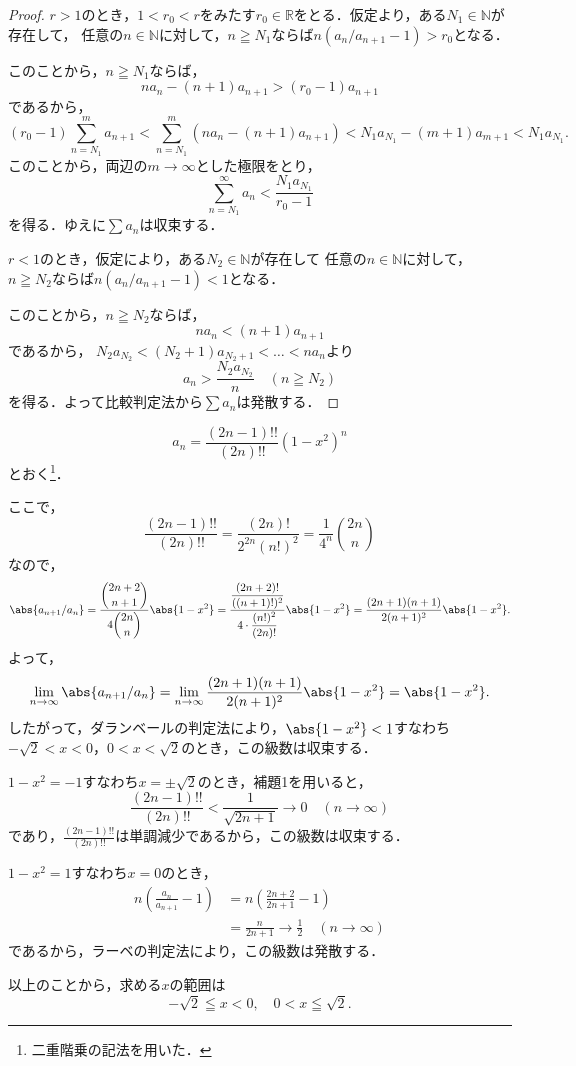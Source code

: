 \begin{proof}
    $r>1$のとき，$ 1< r_0 < r$をみたす$r_0 \in \mathbb{R}$をとる．仮定より，ある$N_1 \in \mathbb{N}$が存在して，
    任意の$n \in \mathbb{N}$に対して，$n \geqq N_1$ならば$n (a_n/a_{n+1}-1) > r_0$となる．

    このことから，$ n \geqq N_1$ならば，
    \[
        n a_n -(n+1)a_{n+1} > (r_0-1) a_{n+1}
    \]
    であるから，
    \[
        (r_0-1) \sum_{n=N_1}^{m} a_{n+1}  < \sum_{n=N_1}^{m} (n a_n - (n+1) a_{n+1})
        <N_1 a_{N_1} - (m+1) a_{m+1}
        < N_1 a_{N_1}.
    \]
    このことから，両辺の$m \to \infty$とした極限をとり，
    \[
        \sum_{n=N_1}^{\infty} a_n <\frac{N_1 a_{N_1}}{r_0-1}
    \]
    を得る．ゆえに$\sum a_n$は収束する．

    $r < 1$のとき，仮定により，ある$N_2 \in \mathbb{N}$が存在して
    任意の$n \in \mathbb{N}$に対して，$n \geqq N_2$ならば$n(a_n/a_{n+1}-1) < 1$となる．

    このことから，$n \geqq N_2$ならば，
    \[
        n a_n < (n+1) a_{n+1}
    \]
    であるから， $N_2 a_{N_2} < (N_2 +1)a_{N_2+1} <  \dots< n a_n $より
    \[
        a_n > \frac{N_2 a_{N_2}}{n} \quad (n \geqq N_2)
    \]
    を得る．よって比較判定法から$\sum a_n$は発散する．
\end{proof}

\begin{tanswer}
    \[
        a_n = \frac{(2n-1)!!}{(2n)!!} (1-x^2)^n
    \]
    とおく\footnote{二重階乗の記法を用いた．}．

    ここで，
    \[
        \frac{(2n-1)!!}{(2n)!!} = \frac{(2n)!}{2^{2n}(n!)^2} = \frac{1}{4^n} \binom{2n}{n}
    \]
    なので，
    \[
        \abs{a_{n+1}/a_n}  = \frac{\dbinom{2n+2}{n+1}}{4\dbinom{2n}{n}} \abs{1-x^2}
        =  \frac{\dfrac{(2n+2)!}{((n+1)!)^2}}{4\cdot \dfrac{(n!)^2}{(2n)!}} \abs{1-x^2}
        =  \frac{(2n+1)(n+1)}{2(n+1)^2} \abs{1-x^2}.
    \]
    よって，
    \[
        \lim_{n\to\infty} \abs{a_{n+1}/a_n}  = \lim_{n\to\infty}  \frac{(2n+1)(n+1)}{2(n+1)^2} \abs{1-x^2} =\abs{1-x^2}.
    \]
    したがって，ダランベールの判定法により，$\abs{1-x^2}<1$すなわち$ -\sqrt{2}<x<0$，$0<x<\sqrt{2}$のとき，この級数は収束する．

    $1-x^2=-1$すなわち$x=\pm \sqrt{2}$のとき，補題1を用いると，
    \[
        \frac{(2n-1)!!}{(2n)!!}< \frac{1}{\sqrt{2n+1}} \to 0 \quad (n \to \infty)
    \]
    であり，$ \frac{(2n-1)!!}{(2n)!!}$は単調減少であるから，この級数は収束する．

    $1-x^2=1$すなわち$x=0$のとき，
    \begin{align*}
        n \left(\frac{a_n}{a_{n+1}}-1\right) & =n\left(\frac{2n+2}{2n+1}-1\right)                   \\
                                             & =\frac{n}{2n+1} \to \frac{1}{2} \quad (n \to \infty)
    \end{align*}
    であるから，ラーベの判定法により，この級数は発散する．

    以上のことから，求める$x$の範囲は
    \[
        -\sqrt{2} \leqq x < 0 , \quad 0 < x \leqq \sqrt{2}.
    \]
\end{tanswer}


